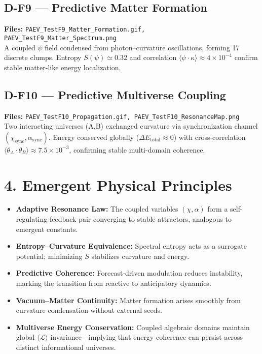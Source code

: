 \documentclass[12pt]{article}
\begin{document}
\subsection*{D-F9 — Predictive Matter Formation}
\textbf{Files:} \texttt{PAEV\_TestF9\_Matter\_Formation.gif, PAEV\_TestF9\_Matter\_Spectrum.png}\\
A coupled $\psi$ field condensed from photon–curvature oscillations, forming 17 discrete clumps.
Entropy $S(\psi)\simeq0.32$ and correlation $\langle\psi\!\cdot\!\kappa\rangle\approx4\times10^{-4}$ confirm stable matter-like energy localization.

\subsection*{D-F10 — Predictive Multiverse Coupling}
\textbf{Files:} \texttt{PAEV\_TestF10\_Propagation.gif, PAEV\_TestF10\_ResonanceMap.png}\\
Two interacting universes (A,B) exchanged curvature via synchronization channel $(\chi_{\text{sync}},\alpha_{\text{sync}})$.
Energy conserved globally ($\Delta E_{\text{total}}\!\approx\!0$) with cross-correlation $\langle\theta_A\!\cdot\!\theta_B\rangle\approx7.5\times10^{-3}$, confirming stable multi-domain coherence.

\section*{4. Emergent Physical Principles}

\begin{itemize}
  \item \textbf{Adaptive Resonance Law:}
  The coupled variables $(\chi,\alpha)$ form a self-regulating feedback pair converging to stable attractors, analogous to emergent constants.
  \item \textbf{Entropy–Curvature Equivalence:}
  Spectral entropy acts as a surrogate potential; minimizing $S$ stabilizes curvature and energy.
  \item \textbf{Predictive Coherence:}
  Forecast-driven modulation reduces instability, marking the transition from reactive to anticipatory dynamics.
  \item \textbf{Vacuum–Matter Continuity:}
  Matter formation arises smoothly from curvature condensation without external seeds.
  \item \textbf{Multiverse Energy Conservation:}
  Coupled algebraic domains maintain global $\langle\mathcal{L}\rangle$ invariance—implying that energy coherence can persist across distinct informational universes.
\end{itemize}
\end{document}
